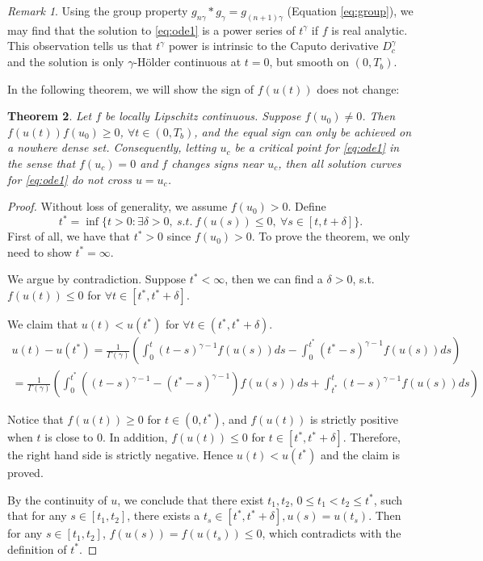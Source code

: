 \documentclass[12pt]{amsart}%
\newtheorem{thm}{Theorem}[section]
\theoremstyle{definition}
\theoremstyle{remark}
\newtheorem{rmk}[thm]{Remark}
\renewcommand{\leq}{\leqslant}
\renewcommand{\geq}{\geqslant}
\renewcommand{\ge}{\geqslant}
\renewcommand{\le}{\leqslant}
\begin{document}
\begin{rmk}
Using the group property $g_{n\gamma}*g_{\gamma}=g_{(n+1)\gamma}$ (Equation \eqref{eq:group}), we may find that the solution to \eqref{eq:ode1} is a power series of $t^{\gamma}$ if $f$ is real analytic. This observation tells us that $t^{\gamma}$ power is intrinsic to the Caputo derivative $D_c^{\gamma}$ and the solution is only $\gamma$-H\"{o}lder continuous at $t=0$, but smooth on $(0, T_b)$.
\end{rmk}

In the following theorem, we will show the sign of $f(u(t))$ does not change:
\begin{thm}\label{thm:behavior}
Let $f$ be locally Lipschitz continuous. Suppose $f(u_0)\neq 0$. Then $f(u(t))f(u_0)\ge 0$, $\forall t\in (0, T_b)$, and the equal sign can only be achieved on a nowhere dense set. Consequently, letting $u_c$ be a critical point for \eqref{eq:ode1} in the sense that $f(u_c)=0$ and $f$ changes signs near $u_c$, then all solution curves for \eqref{eq:ode1} do not cross $u=u_c$.
\end{thm}
\begin{proof}
Without loss of generality, we assume $f(u_0)>0$. Define 
\[
t^*=\inf \Big\{ t>0: \exists \delta >0,~ s.t.~f(u(s))\leq 0, ~\forall s \in [t,t+\delta] \Big\}.
\]
First of all, we have that $t^*>0$ since $f(u_0)>0$.
To prove the theorem, we only need to show $t^*=\infty$.

We argue by contradiction. Suppose $t^*<\infty$, then we can find a $\delta >0$, s.t. 
$f(u(t))\leq 0$ for $\forall t \in [t^*,t^*+\delta]$. 
 
We claim that $u(t) < u(t^*)$ for $ \forall t\in (t^*,t^*+\delta) $.
\begin{multline*}
u(t)-u(t^*)=\frac{1}{\Gamma(\gamma)}\left(\int_0^{t}(t-s)^{\gamma-1}f(u(s))ds-\int_0^{t^*}(t^*-s)^{\gamma-1}f(u(s))ds\right)\\
=\frac{1}{\Gamma(\gamma)}\left(\int_0^{t^*}\left((t-s)^{\gamma-1}-(t^*-s)^{\gamma-1}\right) f(u(s))ds+\int_{t^*}^{t}(t-s)^{\gamma-1}f(u(s))ds\right)
\end{multline*}

Notice that $f(u (t))\geq 0$ for $t\in(0,t^*)$,  and $f(u(t))$ is strictly positive when $t$ is close to 0. In addition, $f(u(t))\leq0$ for $t\in [t^*,t^*+\delta]$. Therefore, the right hand side is strictly negative. Hence $u(t) < u(t^*)$ and the claim is proved.

 By the continuity of $u$, we conclude that there exist $t_1, t_2$, $0\le t_1<t_2\leq t^*$, such that for any $s \in [t_1,t_2]$, there exists a $t_s\in [t^*,t^*+\delta], u(s)=u(t_s)$. Then for any $s \in [t_1,t_2]$, $f(u(s))=f(u(t_s))\leq 0$, which contradicts with the definition of $t^*$. 
\end{proof}
\end{document}
